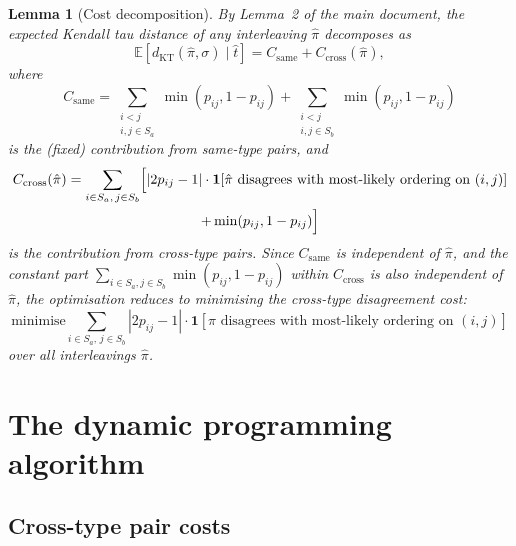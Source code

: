 \documentclass[11pt]{article}
\newtheorem{lemma}[theorem]{Lemma}
\begin{document}
\begin{lemma}[Cost decomposition]\label{lem:cost-decomp}
By Lemma~2 of the main document, the expected Kendall tau distance of any interleaving $\hat{\pi}$ decomposes as
\begin{equation}
\mathbb{E}[d_{\mathrm{KT}}(\hat{\pi}, \sigma) \mid \hat{t}] = C_{\mathrm{same}} + C_{\mathrm{cross}}(\hat{\pi}),
\end{equation}
where
\begin{equation}
C_{\mathrm{same}} = \sum_{\substack{i < j \\ i, j \in S_a}} \min(p_{ij}, 1-p_{ij}) + \sum_{\substack{i < j \\ i, j \in S_b}} \min(p_{ij}, 1-p_{ij})
\end{equation}
is the (fixed) contribution from same-type pairs, and
\begin{multline}\label{eq:cross-cost}
C_{\mathrm{cross}}(\hat{\pi}) = \sum_{i \in S_a,\, j \in S_b} \Bigl[ |2p_{ij} - 1| \cdot \mathbf{1}[\hat{\pi} \text{ disagrees with most-likely ordering on } (i,j)] \\
+ \min(p_{ij}, 1 - p_{ij}) \Bigr]
\end{multline}
is the contribution from cross-type pairs. Since $C_{\mathrm{same}}$ is independent of $\hat{\pi}$, and the constant part $\sum_{i \in S_a, j \in S_b} \min(p_{ij}, 1-p_{ij})$ within $C_{\mathrm{cross}}$ is also independent of $\hat{\pi}$, the optimisation reduces to minimising the cross-type disagreement cost:
\begin{equation}\label{eq:obj}
\mathrm{minimise} \sum_{i \in S_a,\, j \in S_b} |2p_{ij} - 1| \cdot \mathbf{1}[\hat{\pi} \text{ disagrees with most-likely ordering on } (i,j)]
\end{equation}
over all interleavings $\hat{\pi}$.
\end{lemma}

\section{The dynamic programming algorithm}

\subsection{Cross-type pair costs}
\end{document}
